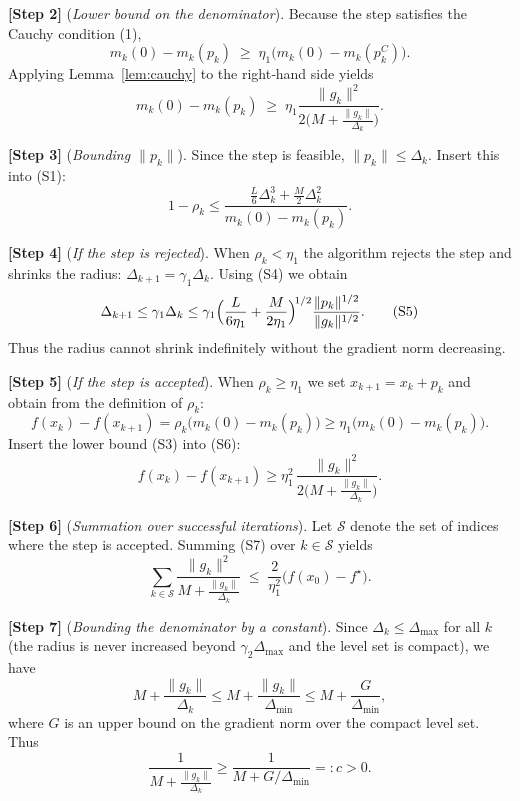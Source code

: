 \documentclass{article}
\begin{document}
\noindent\textbf{[Step 2]} (\emph{Lower bound on the denominator}).  
Because the step satisfies the Cauchy condition (1),
\[
m_{k}(0)-m_{k}(p_{k})\;\ge\;
\eta_{1}\bigl(m_{k}(0)-m_{k}(p_{k}^{C})\bigr).
\tag{S2}
\]
Applying Lemma~\ref{lem:cauchy} to the right‑hand side yields
\[
m_{k}(0)-m_{k}(p_{k})\;\ge\;
\eta_{1}\frac{\|g_{k}\|^{2}}
               {2\bigl(M+\frac{\|g_{k}\|}{\Delta_{k}}\bigr)}.
\tag{S3}
\]

\noindent\textbf{[Step 3]} (\emph{Bounding \(\|p_{k}\|\)}).  
Since the step is feasible,
\(\|p_{k}\|\le\Delta_{k}\).  Insert this into (S1):
\[
1-\rho_{k}
\le
\frac{\frac{L}{6}\Delta_{k}^{3}+\frac{M}{2}\Delta_{k}^{2}}
     {m_{k}(0)-m_{k}(p_{k})}.
\tag{S4}
\]

\noindent\textbf{[Step 4]} (\emph{If the step is rejected}).  
When \(\rho_{k}<\eta_{1}\) the algorithm rejects the step and shrinks the
radius: \(\Delta_{k+1}=\gamma_{1}\Delta_{k}\).  Using (S4) we obtain
\[
\Delta_{k+1}
\le \gamma_{1}\Delta_{k}
\le \gamma_{1}\Bigl(\frac{L}{6\eta_{1}}+\frac{M}{2\eta_{1}}\Bigr)^{\!1/2}
      \frac{\|p_{k}\|^{1/2}}{\|g_{k}\|^{1/2}}.
\tag{S5}
\]
Thus the radius cannot shrink indefinitely without the gradient norm
decreasing.

\noindent\textbf{[Step 5]} (\emph{If the step is accepted}).  
When \(\rho_{k}\ge\eta_{1}\) we set \(x_{k+1}=x_{k}+p_{k}\) and obtain from the
definition of \(\rho_{k}\):
\[
f(x_{k})-f(x_{k+1})
= \rho_{k}\bigl(m_{k}(0)-m_{k}(p_{k})\bigr)
\ge \eta_{1}\bigl(m_{k}(0)-m_{k}(p_{k})\bigr).
\tag{S6}
\]
Insert the lower bound (S3) into (S6):
\[
f(x_{k})-f(x_{k+1})
\ge
\eta_{1}^{2}\,
\frac{\|g_{k}\|^{2}}
     {2\bigl(M+\frac{\|g_{k}\|}{\Delta_{k}}\bigr)}.
\tag{S7}
\]

\noindent\textbf{[Step 6]} (\emph{Summation over successful iterations}).  
Let \(\mathcal{S}\) denote the set of indices where the step is accepted.
Summing (S7) over \(k\in\mathcal{S}\) yields
\[
\sum_{k\in\mathcal{S}}
\frac{\|g_{k}\|^{2}}
     {M+\frac{\|g_{k}\|}{\Delta_{k}}}
\;\le\;
\frac{2}{\eta_{1}^{2}}\bigl(f(x_{0})-f^{\star}\bigr).
\tag{S8}
\]

\noindent\textbf{[Step 7]} (\emph{Bounding the denominator by a constant}).  
Since \(\Delta_{k}\le\Delta_{\max}\) for all \(k\) (the radius is never increased
beyond \(\gamma_{2}\Delta_{\max}\) and the level set is compact), we have
\[
M+\frac{\|g_{k}\|}{\Delta_{k}}
\le M+\frac{\|g_{k}\|}{\Delta_{\min}}
\le M+\frac{G}{\Delta_{\min}},
\]
where \(G\) is an upper bound on the gradient norm over the compact level set.
Thus
\[
\frac{1}{M+\frac{\|g_{k}\|}{\Delta_{k}}}
\ge \frac{1}{M+G/\Delta_{\min}}=:c>0.
\tag{S9}
\]
\end{document}
